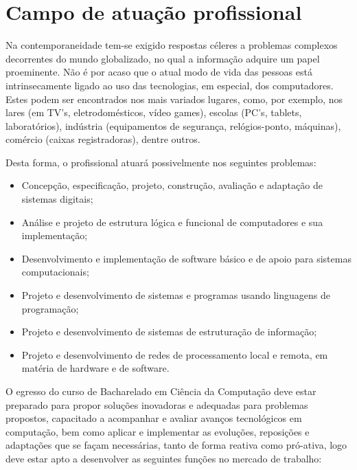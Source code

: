 \documentclass[
	12pt,				%
	openright,			%
  oneside,     %
	a4paper,			%
 hyphens,
	chapter=TITLE,		%
	english,			%
	french,				%
	spanish,			%
	brazil				%
	]{abntex2}
\begin{document}
%
%


\chapter{Campo de atuação profissional}
\label{cap_campo_de_atuacao_profissional}

Na contemporaneidade tem-se exigido respostas céleres a problemas complexos decorrentes do mundo globalizado, no qual a informação adquire um papel proeminente. Não é por acaso que o atual modo de vida das pessoas está intrinsecamente ligado ao uso das tecnologias, em especial, dos computadores. Estes podem ser encontrados nos mais variados lugares, como, por exemplo, nos lares (em TV's, eletrodomésticos, vídeo games), escolas (PC's, tablets, laboratórios), indústria (equipamentos de segurança, relógios-ponto, máquinas), comércio (caixas registradoras), dentre outros. 

Desta forma, o profissional atuará possivelmente nos seguintes problemas:

\begin{itemize}
    \item Concepção, especificação, projeto, construção, avaliação e adaptação de sistemas digitais;
    \item Análise e projeto de estrutura lógica e funcional de computadores e sua implementação;
    \item Desenvolvimento e implementação de software básico e de apoio para sistemas computacionais;
    \item Projeto e desenvolvimento de sistemas e programas usando linguagens de programação;
    \item Projeto e desenvolvimento de sistemas de estruturação de informação;
    \item Projeto e desenvolvimento de redes de processamento local e remota, em matéria de hardware e de software.    
\end{itemize}

O egresso do curso de Bacharelado em Ciência da Computação deve estar preparado para propor soluções inovadoras e adequadas para problemas propostos, capacitado a acompanhar e avaliar avanços tecnológicos em computação, bem como aplicar e implementar as evoluções, reposições e adaptações que se façam necessárias, tanto de forma reativa como pró-ativa, logo deve estar apto a desenvolver as seguintes funções no mercado de trabalho:
\end{document}
